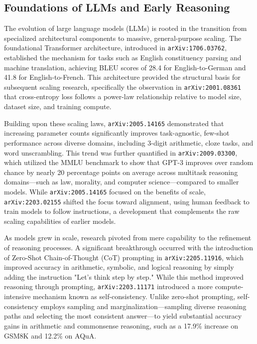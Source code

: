\documentclass[11pt]{article}
\begin{document}
\subsection{Foundations of LLMs and Early Reasoning}

The evolution of large language models (LLMs) is rooted in the transition from specialized architectural components to massive, general-purpose scaling. The foundational Transformer architecture, introduced in \texttt{arXiv:1706.03762}, established the mechanism for tasks such as English constituency parsing and machine translation, achieving BLEU scores of 28.4 for English-to-German and 41.8 for English-to-French. This architecture provided the structural basis for subsequent scaling research, specifically the observation in \texttt{arXiv:2001.08361} that cross-entropy loss follows a power-law relationship relative to model size, dataset size, and training compute.

Building upon these scaling laws, \texttt{arXiv:2005.14165} demonstrated that increasing parameter counts significantly improves task-agnostic, few-shot performance across diverse domains, including 3-digit arithmetic, cloze tasks, and word unscrambling. This trend was further quantified in \texttt{arXiv:2009.03300}, which utilized the MMLU benchmark to show that GPT-3 improves over random chance by nearly 20 percentage points on average across multitask reasoning domains—such as law, morality, and computer science—compared to smaller models. While \texttt{arXiv:2005.14165} focused on the benefits of scale, \texttt{arXiv:2203.02155} shifted the focus toward alignment, using human feedback to train models to follow instructions, a development that complements the raw scaling capabilities of earlier models.

As models grew in scale, research pivoted from mere capability to the refinement of reasoning processes. A significant breakthrough occurred with the introduction of Zero-Shot Chain-of-Thought (CoT) prompting in \texttt{arXiv:2205.11916}, which improved accuracy in arithmetic, symbolic, and logical reasoning by simply adding the instruction "Let's think step by step." While this method improved reasoning through prompting, \texttt{arXiv:2203.11171} introduced a more compute-intensive mechanism known as self-consistency. Unlike zero-shot prompting, self-consistency employs sampling and marginalization—sampling diverse reasoning paths and selecting the most consistent answer—to yield substantial accuracy gains in arithmetic and commonsense reasoning, such as a 17.9\% increase on GSM8K and 12.2\% on AQuA.
\end{document}
